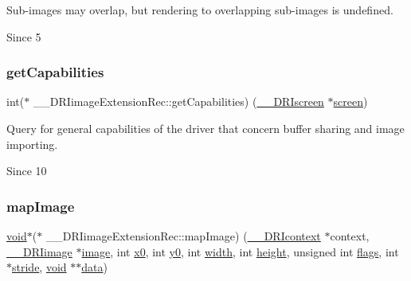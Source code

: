 Sub-\/images may overlap, but rendering to overlapping sub-\/images is undefined.

\begin{DoxySince}{Since}
5 
\end{DoxySince}
\mbox{\label{struct_____d_r_iimage_extension_rec_a1d7762afe105f4a0e0dd1af9a69dde24}} 
\subsubsection{\texorpdfstring{get\+Capabilities}{getCapabilities}}
{\footnotesize\ttfamily int($\ast$ \+\_\+\+\_\+\+D\+R\+Iimage\+Extension\+Rec\+::get\+Capabilities) (\hyperlink{dri__interface_8h_a9961b01d421ee1fd6ed3c05acc9ca561}{\+\_\+\+\_\+\+D\+R\+Iscreen} $\ast$\hyperlink{cad_8h_ae04e09e4e3831bfc1632c509ae37dcec}{screen})}

Query for general capabilities of the driver that concern buffer sharing and image importing.

\begin{DoxySince}{Since}
10 
\end{DoxySince}
\mbox{\label{struct_____d_r_iimage_extension_rec_abdb0fc20bc51e7b9d7b651cf89f922e5}} 
\subsubsection{\texorpdfstring{map\+Image}{mapImage}}
{\footnotesize\ttfamily \hyperlink{_s_d_l__opengles2__gl2ext_8h_ae5d8fa23ad07c48bb609509eae494c95}{void}$\ast$($\ast$ \+\_\+\+\_\+\+D\+R\+Iimage\+Extension\+Rec\+::map\+Image) (\hyperlink{dri__interface_8h_a3fd295cba82b5a3d79f1ee7e12bfb908}{\+\_\+\+\_\+\+D\+R\+Icontext} $\ast$context, \hyperlink{dri__interface_8h_a37e0407153595dc88fe5d25127645cf1}{\+\_\+\+\_\+\+D\+R\+Iimage} $\ast$\hyperlink{gl_8h_a0a221b005894579fea3b9eb7bfc2ee71}{image}, int \hyperlink{glext_8h_a98ac434677655cc8438bb72de2719f39}{x0}, int \hyperlink{glext_8h_ae7f97ed6c9c8e502fcbc44c7cb8a8312}{y0}, int \hyperlink{gl_8h_a9a82cf3caff84cabc4598e2619faac17}{width}, int \hyperlink{gl_8h_aa352f2804b9902ac30769c00dde75d5f}{height}, unsigned int \hyperlink{glcorearb_8h_ac7ba7d3cce3d19ca020e056b37231289}{flags}, int $\ast$\hyperlink{glcorearb_8h_a743715bb319dd426e85b9774559cc0ea}{stride}, \hyperlink{_s_d_l__opengles2__gl2ext_8h_ae5d8fa23ad07c48bb609509eae494c95}{void} $\ast$$\ast$\hyperlink{gl_8h_a2e335d56e2846b0fea47eed068b2d34a}{data})}

